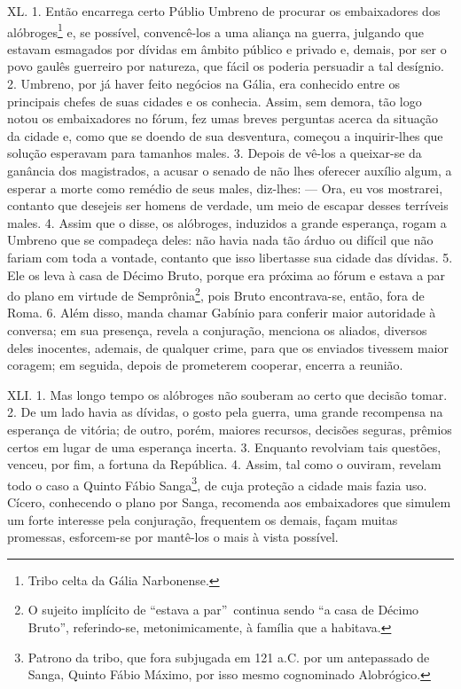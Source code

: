 XL. 1. Então encarrega certo Públio Umbreno de procurar os embaixadores dos
alóbroges\footnote{Tribo celta da Gália Narbonense.} e, se possível,
convencê-los a uma aliança na guerra, julgando que estavam esmagados por
dívidas em âmbito público e privado e, demais, por ser o povo gaulês guerreiro
por natureza, que fácil os poderia persuadir a tal desígnio. 2. Umbreno, por já
haver feito negócios na Gália, era conhecido entre os principais chefes de suas
cidades e os conhecia. Assim, sem demora, tão logo notou os embaixadores no
fórum, fez umas breves perguntas acerca da situação da cidade e, como que se
doendo de sua desventura, começou a inquirir-lhes que solução esperavam para
tamanhos males. 3. Depois de vê-los a queixar-se da ganância dos magistrados, a
acusar o senado de não lhes oferecer auxílio algum, a esperar a morte como
remédio de seus males, diz-lhes: --- Ora, eu vos mostrarei, contanto que
desejeis ser homens de verdade, um meio de escapar desses terríveis males. 4.
Assim que o disse, os alóbroges, induzidos a grande esperança, rogam a Umbreno
que se compadeça deles: não havia nada tão árduo ou difícil que não fariam com
toda a  vontade, contanto que isso libertasse sua cidade das dívidas. 5. Ele os
leva à casa de Décimo Bruto, porque era próxima ao fórum e estava a par do
plano em virtude de Semprônia\footnote{O sujeito implícito de ``estava a par''\
continua sendo ``a casa de Décimo Bruto'', referindo-se, metonimicamente, à família que a habitava.}, pois Bruto encontrava-se, então,
fora de Roma. 6. Além disso, manda chamar Gabínio para conferir maior
autoridade à conversa; em sua presença, revela a conjuração, menciona os
aliados, diversos deles inocentes, ademais, de qualquer crime, para que os
enviados tivessem maior coragem; em seguida, depois de prometerem cooperar,
encerra a reunião. 

XLI. 1. Mas longo tempo os alóbroges não souberam ao certo que decisão tomar.
2. De um lado havia as dívidas, o gosto pela guerra, uma grande recompensa na
esperança de vitória; de outro, porém, maiores recursos, decisões seguras,
prêmios certos em lugar de uma esperança incerta. 3. Enquanto revolviam tais
questões, venceu, por fim, a fortuna da República. 4. Assim, tal como o
ouviram, revelam todo o caso a Quinto Fábio Sanga\footnote{Patrono da tribo,
que fora subjugada em 121 a.C. por um antepassado de Sanga, Quinto Fábio
Máximo, por isso mesmo cognominado Alobrógico.}, de cuja proteção a cidade mais
fazia uso. Cícero, conhecendo o plano por Sanga, recomenda aos embaixadores que
simulem um forte interesse pela conjuração, frequentem os demais, façam
muitas promessas, esforcem-se por mantê-los o mais à vista possível.


